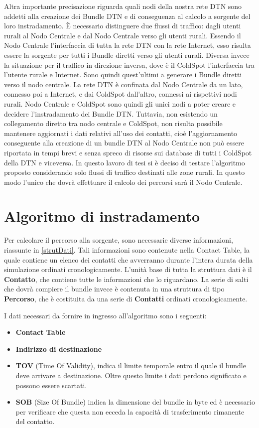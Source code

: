 \documentclass[12pt,a4paper,oneside]{book}
\begin{document}
		Altra importante precisazione riguarda quali nodi della nostra rete DTN sono addetti alla creazione dei Bundle DTN e di conseguenza al calcolo a sorgente del loro instradamento. \`E necessario distinguere due flussi di traffico: dagli utenti rurali al Nodo Centrale e dal Nodo Centrale verso gli utenti rurali. Essendo il Nodo Centrale l'interfaccia di tutta la rete DTN con la rete Internet, esso risulta essere la sorgente per tutti i Bundle diretti verso gli utenti rurali. Diversa invece la situazione per il traffico in direzione inversa, dove è il ColdSpot l'interfaccia tra l'utente rurale e Internet. Sono quindi quest'ultimi a generare i Bundle diretti verso il nodo centrale. La rete DTN è confinata dal Nodo Centrale da un lato, connesso poi a Internet, e dai ColdSpot dall'altro, connessi ai rispettivi nodi rurali. Nodo Centrale e ColdSpot sono quindi gli unici nodi a poter creare e decidere l'instradamento dei Bundle DTN. Tuttavia, non esistendo un collegamento diretto tra nodo centrale e ColdSpot, non risulta possibile mantenere aggiornati i dati relativi all'uso dei contatti, cioè l'aggiornamento conseguente alla creazione di un bundle DTN al Nodo Centrale non può essere riportata in tempi brevi e senza spreco di risorse sui database di tutti i ColdSpot della DTN e viceversa. In questo lavoro di tesi si è deciso di testare l'algoritmo proposto considerando solo flussi di traffico destinati alle zone rurali. In questo modo l'unico che dovrà effettuare il calcolo dei percorsi sarà il Nodo Centrale.
		

		\section{Algoritmo di instradamento} \label{algritmInstrad}
		
		Per calcolare il percorso alla sorgente, sono necessarie diverse informazioni, riassunte in  \ref{strutDati}. Tali informazioni sono contenute nella Contact Table, la quale contiene un elenco dei contatti che avverranno durante l'intera durata della simulazione ordinati cronologicamente. L'unità base di tutta la struttura dati è il {\bf Contatto}, che contiene tutte le informazioni che lo riguardano. La serie di salti che dovrà compiere il bundle invece è contenuta in una struttura di tipo {\bf Percorso}, che è costituita da una serie di {\bf Contatti} ordinati cronologicamente. 
		
		I dati necessari da fornire in ingresso all'algoritmo sono i seguenti:
		\begin{itemize}
			\item {\bf Contact Table}
			\item {\bf Indirizzo di destinazione}
			\item {\bf TOV} (Time Of Validity), indica il limite temporale entro il quale il bundle deve arrivare a destinazione. Oltre questo limite i dati perdono significato e possono essere scartati. 
			\item {\bf SOB} (Size Of Bundle) indica la dimensione del bundle in byte ed è necessario per verificare che questa non ecceda la capacità di trasferimento rimanente del contatto.
		\end{itemize}
		
\end{document}
